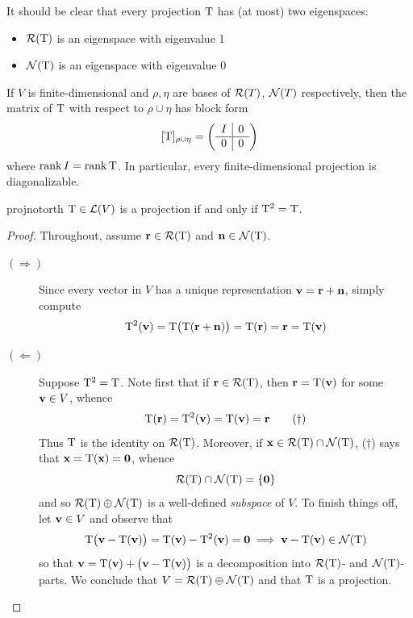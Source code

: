 It should be clear that every projection $\mathrm{T}$ has (at most) two eigenspaces:
\begin{itemize}
  \item $\mathcal{R}(\mathrm{T})$ is an eigenspace with eigenvalue 1
  \item $\mathcal{N}(\mathrm{T})$ is an eigenspace with eigenvalue 0
\end{itemize}
If $V$ is finite-dimensional and $\rho,\eta$ are bases of $\mathcal{R}(T)$, $\mathcal{N}(T)$ respectively, then the matrix of $\mathrm{T}$ with respect to $\rho\cup\eta$ has block form
\[
	[\mathrm{T}]_{\rho\cup\eta} =\left(
	\begin{array}{c|c}
		I&0\\\hline
		0&0
	\end{array}
	\right)
\]
where $\operatorname{rank} I=\operatorname{rank}\mathrm{T}$. In particular, every finite-dimensional projection is diagonalizable.


\pagebreak[3]


\begin{lemm}{}{projnotorth}
	$\mathrm{T}\in\mathcal{L}(V)$ is a projection if and only if $\mathrm{T}^2=\mathrm{T}$.
\end{lemm}

\begin{proof}
	Throughout, assume ${\mathbf{r}}\in\mathcal{R}(\mathrm{T})$ and ${\mathbf{n}}\in\mathcal{N}(\mathrm{T})$.
	\begin{description}
		\item[$(\Rightarrow)$] Since every vector in $V$ has a unique representation ${\mathbf{v}}={\mathbf{r}}+{\mathbf{n}}$, simply compute
		\[
			\mathrm{T}^2({\mathbf{v}}) =\mathrm{T}\bigl(\mathrm{T}({\mathbf{r}}+{\mathbf{n}})\bigr)
			=\mathrm{T}({\mathbf{r}})={\mathbf{r}}=\mathrm{T}({\mathbf{v}})
		\]
		\item[$(\Leftarrow)$] Suppose $\mathrm{T}^2=\mathrm{T}$. Note first that if ${\mathbf{r}}\in\mathcal{R}(\mathrm{T})$, then ${\mathbf{r}}=\mathrm{T}({\mathbf{v}})$ for some ${\mathbf{v}}\in V$, whence
		\[
			\mathrm{T}({\mathbf{r}})=\mathrm{T}^2({\mathbf{v}})=\mathrm{T}({\mathbf{v}})={\mathbf{r}}\tag{$\dag$}
		\]
		Thus $\mathrm{T}$ is the identity on $\mathcal{R}(\mathrm{T})$. Moreover, if ${\mathbf{x}}\in\mathcal{R}(\mathrm{T})\cap\mathcal{N}(\mathrm{T})$, ($\dag$) says that ${\mathbf{x}}=\mathrm{T}({\mathbf{x}})=\mathbf{0}$, whence
		\[
			\mathcal{R}(\mathrm{T})\cap\mathcal{N}(\mathrm{T})=\{\mathbf{0}\}
		\]
		and so $\mathcal{R}(\mathrm{T})\oplus\mathcal{N}(\mathrm{T})$ is a well-defined \emph{subspace} of $V$.\footnotemark{} To finish things off, let ${\mathbf{v}}\in V$ and observe that
		\[
			\mathrm{T}\bigl({\mathbf{v}}-\mathrm{T}({\mathbf{v}})\bigr)=\mathrm{T}({\mathbf{v}})-\mathrm{T}^2({\mathbf{v}})=\mathbf{0}\implies {\mathbf{v}}-\mathrm{T}({\mathbf{v}})\in\mathcal{N}(\mathrm{T})
		\]
		so that ${\mathbf{v}}=\mathrm{T}({\mathbf{v}})+\bigl({\mathbf{v}}-\mathrm{T}({\mathbf{v}})\bigr)$ is a decomposition into $\mathcal{R}(\mathrm{T})$- and $\mathcal{N}(\mathrm{T})$-parts. We conclude that $V=\mathcal{R}(\mathrm{T})\oplus\mathcal{N}(\mathrm{T})$ and that $\mathrm{T}$ is a projection.\qedhere
	\end{description}
\end{proof}



